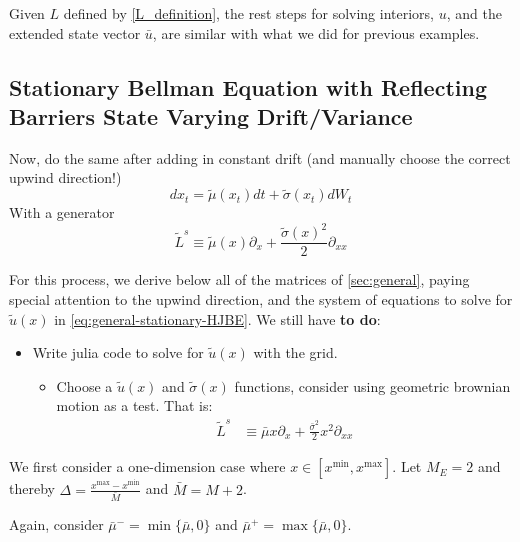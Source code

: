 \documentclass[11pt]{article}
\newcommand{\D}[1][]{\ensuremath{\partial_{#1}}}
\begin{document}
Given $L$ defined by \cref{L_definition}, the rest steps for solving interiors, $u$, and the extended state vector $\bar{u}$, are similar with what we did for previous examples.


\subsection{Stationary Bellman Equation with Reflecting Barriers State Varying Drift/Variance}
Now, do the same after adding in constant drift (and manually choose the correct upwind direction!)
$$
d x_t = \tilde{\mu}(x_t) dt + \tilde{\sigma}(x_t) d W_t
$$
With a generator
$$
\tilde{L}^s \equiv \tilde{\mu}(x) \D[x] + \frac{\tilde{\sigma}(x)^2}{2}\D[xx]
$$

For this process, we derive below all of the matrices of \cref{sec:general}, paying special attention to the upwind direction, and the system of equations to solve for $\tilde{u}(x)$ in \cref{eq:general-stationary-HJBE}. We still have \textbf{to do}:
\begin{itemize}
	\item Write julia code to solve for $\tilde{u}(x)$ with the grid.
	\begin{itemize}
		\item Choose a $\tilde{u}(x)$ and $\tilde{\sigma}(x)$ functions, consider using geometric brownian motion as a test.  That is:
		\begin{align}
		\tilde{L}^s &\equiv \bar{\mu} x \D[x] + \frac{\bar{\sigma}^2}{2}x^2\D[xx]
		\end{align}
	\end{itemize}
\end{itemize}

We first consider a one-dimension case where $x\in [x^{\min},x^{\max}]$. Let $M_E = 2$ and thereby $\Delta  = \frac{x^{\max}-x^{\min}}{\bar{M}}$ and $\bar{M} = M+2$.

Again, consider $\bar{\mu}^- = \min\{\bar{\mu}, 0\}$ and $\bar{\mu}^+  = \max\{\bar{\mu}, 0\}$.
\end{document}
